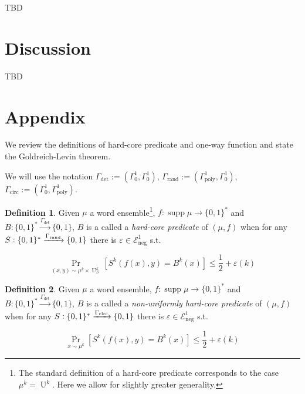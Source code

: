 \documentclass{article}
\numberwithin{equation}{section}
\theoremstyle{definition}
\newtheorem{definition}{Definition}[section]
\theoremstyle{plain}
\newcommand{\Bool}{\{0,1\}}
\newcommand{\Words}{{\Bool^*}}
\DeclareMathOperator{\Supp}{supp}
\DeclareMathOperator{\Prb}{Pr}
\DeclareMathOperator{\U}{U}
\newcommand{\Fall}{\mathcal{E}}
\begin{document}
TBD

\section{Discussion}
\label{sec:discussion}

TBD

\appendix

\section{Appendix}

We review the definitions of hard-core predicate and one-way function and state the Goldreich-Levin theorem.

We will use the notation $\Gamma_{\text{det}}:=(\Gamma_0^1,\Gamma_0^1)$, $\Gamma_{\text{rand}}:=(\Gamma_{\text{poly}}^1,\Gamma_0^1)$, ${\Gamma_{\text{circ}}:=(\Gamma_0^1,\Gamma_{\text{poly}}^1)}$.

\begin{samepage}
\begin{definition}

Given $\mu$ a word ensemble\footnote{The standard definition of a hard-core predicate corresponds to the case $\mu^k=\U^k$. Here we allow for slightly greater generality.}, $f: \Supp \mu \rightarrow \Words$ and ${B: \Words \xrightarrow{\Gamma_{\text{det}}} \Bool}$, $B$ is a called a \emph{hard-core predicate} of $(\mu,f)$ when for any $S: \Words \xrightarrow{\Gamma_{\textnormal{rand}}} \Bool$ there is $\varepsilon \in \Fall_{\text{neg}}^1$ s.t. 

\begin{equation}
\Prb_{(x,y) \sim \mu^k \times \U_S^k}[S^k(f(x),y)=B^k(x)] \leq \frac{1}{2} + \varepsilon(k)
\end{equation}

\end{definition}
\end{samepage}

\begin{samepage}
\begin{definition}

Given $\mu$ a word ensemble, $f: \Supp \mu \rightarrow \Words$ and ${B: \Words \xrightarrow{\Gamma_{\text{det}}} \Bool}$, $B$ is a called a \emph{non-uniformly hard-core predicate} of $(\mu,f)$ when for any ${S: \Words \xrightarrow{\Gamma_{\textnormal{circ}}} \Bool}$ there is $\varepsilon \in \Fall_{\text{neg}}^1$ s.t. 

\begin{equation}
\Prb_{x \sim \mu^k}[S^k(f(x),y)=B^k(x)] \leq \frac{1}{2} + \varepsilon(k)
\end{equation}

\end{definition}
\end{samepage}
\end{document}

